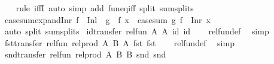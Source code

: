 \begin{isabellebody}
%
\isadelimproof
\ \ %
\endisadelimproof
%
\isatagproof
{}\isamarkupfalse%
\ {\isacharparenleft}{\kern0pt}rule\ iffI{\isacharparenright}{\kern0pt}\ {\isacharparenleft}{\kern0pt}auto\ simp\ add{\isacharcolon}{\kern0pt}\ fun{\isacharunderscore}{\kern0pt}eq{\isacharunderscore}{\kern0pt}iff\ split{\isacharcolon}{\kern0pt}\ sum{\isachardot}{\kern0pt}splits{\isacharparenright}{\kern0pt}%
\endisatagproof
{\isafoldproof}%
%
\isadelimproof
\isanewline
%
\endisadelimproof
\isanewline
{}\isamarkupfalse%
\ case{\isacharunderscore}{\kern0pt}sum{\isacharunderscore}{\kern0pt}expand{\isacharunderscore}{\kern0pt}Inr{\isacharcolon}{\kern0pt}\ {\isachardoublequoteopen}f\ {\isasymcirc}\ Inl\ {\isacharequal}{\kern0pt}\ g\ {\isasymLongrightarrow}\ f\ x\ {\isacharequal}{\kern0pt}\ case{\isacharunderscore}{\kern0pt}sum\ g\ {\isacharparenleft}{\kern0pt}f\ {\isasymcirc}\ Inr{\isacharparenright}{\kern0pt}\ x{\isachardoublequoteclose}\isanewline
%
\isadelimproof
\ \ %
\endisadelimproof
%
\isatagproof
{}\isamarkupfalse%
\ {\isacharparenleft}{\kern0pt}auto\ split{\isacharcolon}{\kern0pt}\ sum{\isachardot}{\kern0pt}splits{\isacharparenright}{\kern0pt}%
\endisatagproof
{\isafoldproof}%
%
\isadelimproof
\isanewline
%
\endisadelimproof
\isanewline
{}\isamarkupfalse%
\ id{\isacharunderscore}{\kern0pt}transfer{\isacharcolon}{\kern0pt}\ {\isachardoublequoteopen}rel{\isacharunderscore}{\kern0pt}fun\ A\ A\ id\ id{\isachardoublequoteclose}\isanewline
%
\isadelimproof
\ \ %
\endisadelimproof
%
\isatagproof
{}\isamarkupfalse%
\ rel{\isacharunderscore}{\kern0pt}fun{\isacharunderscore}{\kern0pt}def\ \isamarkupfalse%
\ simp%
\endisatagproof
{\isafoldproof}%
%
\isadelimproof
\isanewline
%
\endisadelimproof
\isanewline
{}\isamarkupfalse%
\ fst{\isacharunderscore}{\kern0pt}transfer{\isacharcolon}{\kern0pt}\ {\isachardoublequoteopen}rel{\isacharunderscore}{\kern0pt}fun\ {\isacharparenleft}{\kern0pt}rel{\isacharunderscore}{\kern0pt}prod\ A\ B{\isacharparenright}{\kern0pt}\ A\ fst\ fst{\isachardoublequoteclose}\isanewline
%
\isadelimproof
\ \ %
\endisadelimproof
%
\isatagproof
{}\isamarkupfalse%
\ rel{\isacharunderscore}{\kern0pt}fun{\isacharunderscore}{\kern0pt}def\ \isamarkupfalse%
\ simp%
\endisatagproof
{\isafoldproof}%
%
\isadelimproof
\isanewline
%
\endisadelimproof
\isanewline
{}\isamarkupfalse%
\ snd{\isacharunderscore}{\kern0pt}transfer{\isacharcolon}{\kern0pt}\ {\isachardoublequoteopen}rel{\isacharunderscore}{\kern0pt}fun\ {\isacharparenleft}{\kern0pt}rel{\isacharunderscore}{\kern0pt}prod\ A\ B{\isacharparenright}{\kern0pt}\ B\ snd\ snd{\isachardoublequoteclose}\isanewline

\end{isabellebody}
